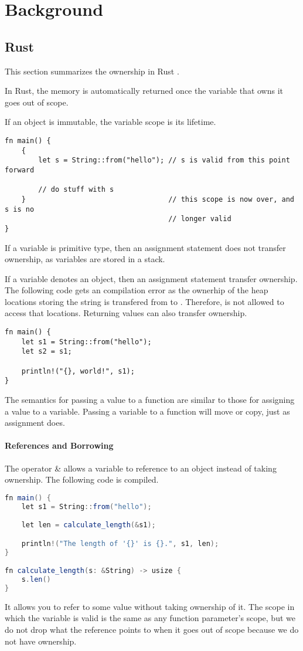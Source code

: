 \section{Background}
\subsection{Rust}
This section summarizes the ownership in Rust \cite{rust}.

In Rust, the memory is automatically returned once the variable that owns it goes out of scope. 

If an object is immutable, the variable scope is its lifetime.
\begin{lstlisting}[basicstyle=\footnotesize\ttfamily]
fn main() {
    {
        let s = String::from("hello"); // s is valid from this point forward

        // do stuff with s
    }                                  // this scope is now over, and s is no
                                       // longer valid
}
\end{lstlisting} 

If a variable is primitive type, then an assignment statement does not transfer ownership, as variables are stored in a stack.

If a variable denotes an object, then an assignment statement transfer ownership. The following code gets an compilation error as the ownerhip of the heap locations storing the string is transfered from  to . Therefore,  is not allowed to access that locations. Returning values can also transfer ownership.
\begin{lstlisting}[basicstyle=\footnotesize\ttfamily]
fn main() {
    let s1 = String::from("hello");
    let s2 = s1;

    println!("{}, world!", s1);
}
\end{lstlisting} 

The semantics for passing a value to a function are similar to those for assigning a value to a variable. Passing a variable to a function will move or copy, just as assignment does. 

\paragraph{References and Borrowing}
The operator \& allows a variable to reference to an object instead of taking ownership. The following code is compiled.
\begin{lstlisting}[language=Scala,basicstyle=\footnotesize\ttfamily]
fn main() {
    let s1 = String::from("hello");

    let len = calculate_length(&s1);

    println!("The length of '{}' is {}.", s1, len);
}

fn calculate_length(s: &String) -> usize {
    s.len()
}

\end{lstlisting}
It allows you to refer to some value without taking ownership of it.
The scope in which the variable  is valid is the same as any function parameter's scope, but we do not drop what the reference points to when it goes out of scope because we do not have ownership. 
